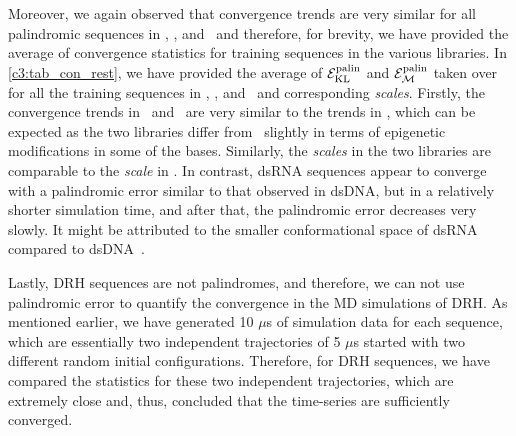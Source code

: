Moreover, we again observed that convergence trends are very similar for all palindromic sequences in \Lbrna, \Lbm, and \Lbh \ and therefore, for brevity, we have provided the average of convergence statistics for training sequences in the various libraries. In \cref{c3:tab_con_rest}, we have provided the average of ${\mathcal E}_{\text{KL}}^{\text{palin}}$ and ${\mathcal E}_{\mathcal{M}}^{\text{palin}}$ taken over for all the training sequences in \Lbrna, \Lbm, and \Lbh \ and corresponding \textit{scales}.
Firstly, the convergence trends in \Lbm \ and \Lbm \ are very similar to the trends in \Lbdna, which can be expected as the two libraries differ from \Lbdna \ slightly in terms of epigenetic modifications in some of the bases.
Similarly, the \textit{scales} in the two libraries are comparable to the \textit{scale} in \Lbdna. 
In contrast, dsRNA sequences appear to converge with a palindromic error similar to that observed in dsDNA, but in a relatively shorter simulation time, and after that, the palindromic error decreases very slowly.  
It might be attributed to the smaller conformational space of dsRNA compared to dsDNA~\cite{noy2004relative,noy2005structure}.

Lastly, DRH sequences are not palindromes, and therefore, we can not use palindromic error to quantify the convergence in the MD simulations of DRH. 
As mentioned earlier, we have generated 10 $\mu$s of simulation data for each sequence, which are essentially two independent trajectories of 5 $\mu$s started with two different random initial configurations. 
Therefore, for DRH sequences, we have compared the statistics for these two independent trajectories, which are extremely close and, thus, concluded that the time-series are sufficiently converged.
\clearpage

